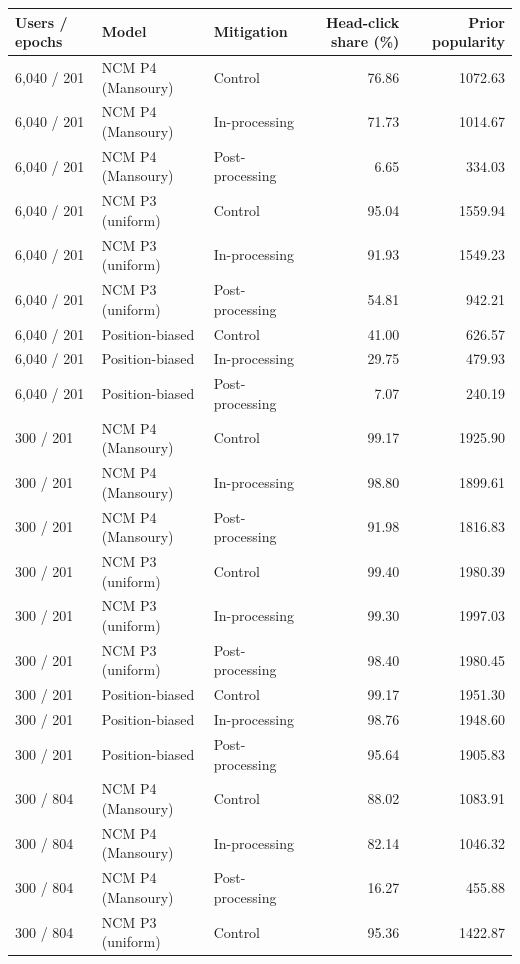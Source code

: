 \begin{table}[htbp!]
\centering
\small
\setlength{\tabcolsep}{3pt}
\renewcommand{\arraystretch}{1.1}
\begin{tabular}{lllrr}
\hline
Users / epochs & Model & Mitigation & Head-click share (\%) & Prior popularity \\
\hline
6,040 / 201 & NCM P4 (Mansoury) & Control & 76.86 & 1072.63 \\
6,040 / 201 & NCM P4 (Mansoury) & In-processing & 71.73 & 1014.67 \\
6,040 / 201 & NCM P4 (Mansoury) & Post-processing & 6.65 & 334.03 \\
6,040 / 201 & NCM P3 (uniform) & Control & 95.04 & 1559.94 \\
6,040 / 201 & NCM P3 (uniform) & In-processing & 91.93 & 1549.23 \\
6,040 / 201 & NCM P3 (uniform) & Post-processing & 54.81 & 942.21 \\
6,040 / 201 & Position-biased & Control & 41.00 & 626.57 \\
6,040 / 201 & Position-biased & In-processing & 29.75 & 479.93 \\
6,040 / 201 & Position-biased & Post-processing & 7.07 & 240.19 \\
300 / 201 & NCM P4 (Mansoury) & Control & 99.17 & 1925.90 \\
300 / 201 & NCM P4 (Mansoury) & In-processing & 98.80 & 1899.61 \\
300 / 201 & NCM P4 (Mansoury) & Post-processing & 91.98 & 1816.83 \\
300 / 201 & NCM P3 (uniform) & Control & 99.40 & 1980.39 \\
300 / 201 & NCM P3 (uniform) & In-processing & 99.30 & 1997.03 \\
300 / 201 & NCM P3 (uniform) & Post-processing & 98.40 & 1980.45 \\
300 / 201 & Position-biased & Control & 99.17 & 1951.30 \\
300 / 201 & Position-biased & In-processing & 98.76 & 1948.60 \\
300 / 201 & Position-biased & Post-processing & 95.64 & 1905.83 \\
300 / 804 & NCM P4 (Mansoury) & Control & 88.02 & 1083.91 \\
300 / 804 & NCM P4 (Mansoury) & In-processing & 82.14 & 1046.32 \\
300 / 804 & NCM P4 (Mansoury) & Post-processing & 16.27 & 455.88 \\
300 / 804 & NCM P3 (uniform) & Control & 95.36 & 1422.87 \\

\end{tabular}
\end{table}
